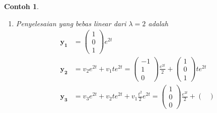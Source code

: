 \documentclass[a4paper]{article}
\theoremstyle{definisi}
\newtheorem{contoh}{Contoh}[section]
\numberwithin{equation}{section}
\begin{document}
\begin{contoh}
\begin{enumerate}[label=Langkah \arabic*: ,leftmargin=*]
\begin{equation*}
      \end{equation*}
      Lalu kita lakukan kembali untuk mendapatkan $\mathbf{v_3}$ dengan $(A-2I)\mathbf{v_3}=\mathbf{v_2}$, sehingga
      \begin{equation*}
        \begin{pmatrix}
          -1&1&1&\vdots&\frac{1}{2}\\
          1&1&-1&\vdots&\frac{1}{2}\\
          0&2&0&\vdots&0
        \end{pmatrix}\sim
        \begin{pmatrix}
          1&0&-1&\vdots&\frac{1}{2}\\
          0&1&0&\vdots&0\\
          0&0&0&\vdots&0
        \end{pmatrix}
      \end{equation*}
      Misalkan $v_3=0$ berakibat $v_1=\frac{1}{2}$ dan $v_2=0$, sehingga
      \begin{equation*}
        \mathbf{v_3}=\frac{1}{2}\begin{pmatrix}
          1\\0\\0
        \end{pmatrix}
      \end{equation*}
      \item Penyelesaian yang bebas linear dari $\lambda=2$ adalah
      \begin{align*}
        \mathbf{y_1}&=\begin{pmatrix}
          1\\0\\1
        \end{pmatrix}e^{2t}\\
        \mathbf{y_2}&=v_2e^{2t}+v_1te^{2t}= \begin{pmatrix}
          -1\\1\\0
        \end{pmatrix}\frac{e^{2t}}{2}+\begin{pmatrix}
          1\\0\\1
        \end{pmatrix}te^{2t}\\
        \mathbf{y_3}&=v_3e^{2t}+v_2te^{2t}+v_1\frac{t^2}{2}e^{2t}=\begin{pmatrix}
          1\\0\\0
        \end{pmatrix}\frac{e^{2t}}{2}+\begin{pmatrix}

\end{pmatrix}
\end{align*}
\end{enumerate}
\end{contoh}
\end{document}
